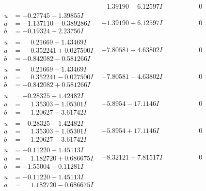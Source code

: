 \documentclass[1p]{elsarticle_modified}
\theoremstyle{definition}
\begin{document}
$$\begin{array}{c|c|c}
 & -1.39190 - 6.12597 I & \phantom{-0.000000 } 0 \\ \hline\begin{aligned}
u &= -0.27745 - 1.39855 I \\
a &= -1.137110 - 0.389286 I \\
b &= -0.19324 + 2.23756 I\end{aligned}
 & -1.39190 + 6.12597 I & \phantom{-0.000000 } 0 \\ \hline\begin{aligned}
u &= \phantom{-}0.21669 + 1.43469 I \\
a &= \phantom{-}0.352241 + 0.027500 I \\
b &= -0.842082 - 0.581266 I\end{aligned}
 & -7.80581 + 4.63802 I & \phantom{-0.000000 } 0 \\ \hline\begin{aligned}
u &= \phantom{-}0.21669 - 1.43469 I \\
a &= \phantom{-}0.352241 - 0.027500 I \\
b &= -0.842082 + 0.581266 I\end{aligned}
 & -7.80581 - 4.63802 I & \phantom{-0.000000 } 0 \\ \hline\begin{aligned}
u &= -0.28325 + 1.42482 I \\
a &= \phantom{-}1.35303 - 1.05301 I \\
b &= \phantom{-}1.20627 + 3.61742 I\end{aligned}
 & -5.8954 - 17.1146 I & \phantom{-0.000000 } 0 \\ \hline\begin{aligned}
u &= -0.28325 - 1.42482 I \\
a &= \phantom{-}1.35303 + 1.05301 I \\
b &= \phantom{-}1.20627 - 3.61742 I\end{aligned}
 & -5.8954 + 17.1146 I & \phantom{-0.000000 } 0 \\ \hline\begin{aligned}
u &= -0.11220 + 1.45113 I \\
a &= \phantom{-}1.182720 + 0.686675 I \\
b &= -1.55004 - 0.11281 I\end{aligned}
 & -8.32121 + 7.81517 I & \phantom{-0.000000 } 0 \\ \hline\begin{aligned}
u &= -0.11220 - 1.45113 I \\
a &= \phantom{-}1.182720 - 0.686675 I \\

\end{aligned}
\end{array}$$
\end{document}
